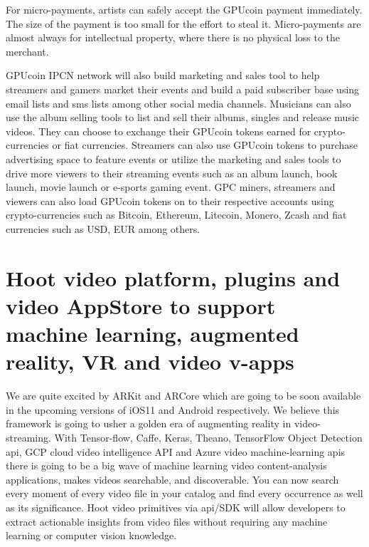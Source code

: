 \documentclass{article}
\begin{document}
For micro-payments, artists can safely accept the GPUcoin payment immediately. The size of the payment is too small for the effort to steal it. Micro-payments are almost always for intellectual property, where there is no physical loss to the merchant.

 GPUcoin IPCN network will also build marketing and sales tool to help streamers and gamers market their events and build a paid subscriber base using email lists and sms lists among other social media channels. 
Musicians can also use the album selling tools to list and sell their albums, singles and release music videos. They can choose to exchange their GPUcoin tokens earned for crypto-currencies or fiat currencies.
 Streamers can also use GPUcoin tokens to purchase advertising space to feature events or utilize the marketing and sales tools to drive more viewers to their streaming events such as an album launch, book launch, movie launch or e-sports gaming event. GPC miners, streamers and viewers can also load GPUcoin tokens on to their respective accounts using crypto-currencies such as Bitcoin, Ethereum, Litecoin, Monero, Zcash and fiat currencies such as USD, EUR among others.

\section{Hoot video platform, plugins and video AppStore to support machine learning, augmented reality, VR and video v-apps}
We are quite excited by ARKit and ARCore which are going to be soon available in the upcoming versions of iOS11 and Android respectively. We believe this framework is going to usher a golden era of augmenting reality in video-streaming. With Tensor-flow, Caffe, Keras, Theano, TensorFlow Object Detection api, GCP cloud video intelligence API and Azure video machine-learning apis there is going to be a big wave of machine learning video content-analysis applications, makes videos searchable, and discoverable. You can now search every moment of every video file in your catalog and find every occurrence as well as its significance. Hoot video primitives via api/SDK will allow developers to extract actionable insights from video files without requiring any machine learning or computer vision knowledge. 
\end{document}

